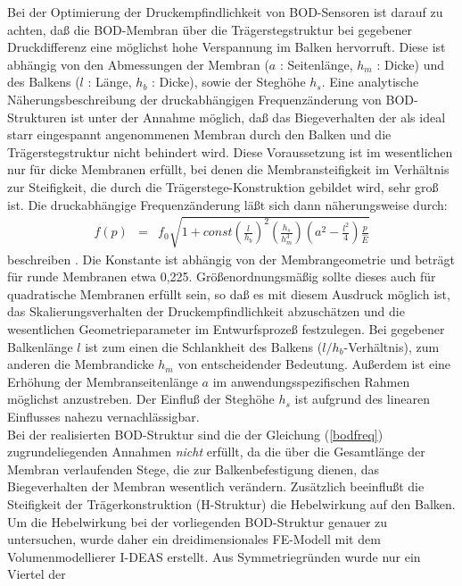 Bei der Optimierung der Druckempfindlichkeit von BOD-Sensoren ist darauf zu
achten, daß die BOD-Membran über die Trägerstegstruktur bei gegebener
Druckdifferenz eine möglichst hohe Verspannung im Balken hervorruft.
Diese ist abhängig von den Abmessungen der Membran ($a$ : Seitenlänge,
$h_{m}$ : Dicke) und
des Balkens ($l$ : Länge, $h_{b}$ : Dicke), sowie der Steghöhe $h_{s}$.
Eine analytische Näherungsbeschreibung der druckabhängigen Frequenzänderung
von BOD-Strukturen ist unter der Annahme möglich, daß das Biegeverhalten der
als ideal starr eingespannt angenommenen Membran durch den Balken und die
Trägerstegstruktur nicht
behindert wird. Diese Voraussetzung ist im wesentlichen nur für
dicke Membranen erfüllt, bei denen die Membransteifigkeit im Verhältnis zur
Steifigkeit, die durch die Trägerstege-Konstruktion gebildet wird, sehr groß
ist. Die druckabhängige Frequenzänderung läßt sich dann näherungsweise
durch:
\begin{eqnarray}
\label{bodfreq}
 f(p) & = & f_{0} \sqrt{ 1 + const
      \left( \frac{l}{h_{b}} \right)^2
      \left( \frac {h_{s}} {{h_{m}^3}} \right)
      \left( a^2 - \frac {l^2} {4}   \right)
      \frac {p} {\hat E}  }
\end{eqnarray}
beschreiben \cite{Tho90}. Die Konstante ist abhängig von der Membrangeometrie
und beträgt für runde Membranen etwa 0,225. Größenordnungsmäßig sollte
dieses auch für quadratische Membranen erfüllt sein, so daß es mit diesem
Ausdruck möglich ist, das Skalierungsverhalten der Druckempfindlichkeit
abzuschätzen und
die wesentlichen Geometrieparameter im Entwurfsprozeß festzulegen.
Bei gegebener Balkenlänge $l$ ist zum einen die Schlankheit des Balkens
($l/h_{b}$-Verhältnis), zum anderen die Membrandicke $h_{m}$ von
entscheidender Bedeutung. Außerdem ist eine Erhöhung der
Membranseitenlänge $a$ im anwendungsspezifischen Rahmen möglichst
anzustreben. Der Einfluß der Steghöhe $h_{s}$ ist aufgrund des linearen
Einflusses nahezu vernachlässigbar.\\
%
Bei der realisierten BOD-Struktur sind die der Gleichung (\ref{bodfreq})
zugrundeliegenden Annahmen {\em nicht} erfüllt, da die über die Gesamtlänge
der Membran verlaufenden Stege,
die zur Balkenbefestigung dienen, das Biegeverhalten der Membran wesentlich
verändern. Zusätzlich beeinflußt die Steifigkeit der Trägerkonstruktion
(H-Struktur) die Hebelwirkung auf den Balken. Um die Hebelwirkung bei
der vorliegenden BOD-Struktur genauer zu untersuchen, wurde daher ein
dreidimensionales FE-Modell mit dem Volumenmodellierer {\sf I-DEAS}
\cite{SDRC} erstellt. Aus Symmetriegründen wurde nur ein Viertel der
